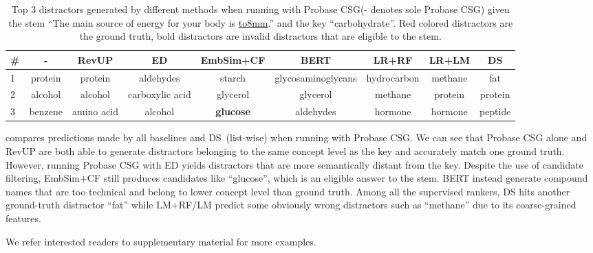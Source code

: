 \begin{table}[htb!]%
	\small
	\centering
		\begin{tabular}{lcccccccc} %
			\toprule
			\# &-  &RevUP &ED  & EmbSim+CF &BERT & LR+RF & LR+LM & \textbf{DS}\\
			\midrule
			1 &\color{red}protein   &\color{red}protein  &aldehydes  &starch &glycosaminoglycans  & hydrocarbon &methane    &\color{red} fat\\
			\midrule
			2 &alcohol  &alcohol  &carboxylic acid  &glycerol  &glycerol &methane  &\color{red}protein    &\color{red}protein \\
			\midrule
			3 &benzene  &amino acid  &alcohol   &\textbf{glucose}  &aldehydes &hormone  &hormone   &peptide \\
			\bottomrule
		\end{tabular}
		\caption{Top 3 distractors generated by different methods when running with Probase CSG(- denotes sole Probase CSG)
	given the stem ``The main source of energy for your body is \underline{\hbox to8mm{}}.'' and the key ``{\color{blue}carbohydrate}''. Red colored distractors are the ground truth, bold distractors are invalid distractors that are eligible to the stem.}
		\label{table:example}
	\end{table}
 compares predictions made by all baselines and DS~(list-wise) when running with Probase CSG. We can see that Probase CSG alone and RevUP are both able to generate distractors belonging to the same concept level as the key and accurately match one ground truth. However, running Probase CSG with ED yields 
distractors that are more semantically distant from the key. 
Despite the use of candidate filtering, EmbSim+CF still produces candidates 
like ``glucose'', which is an eligible answer to the stem. 
BERT instead generate compound names that are too technical and belong to lower concept level than ground truth. 
Among all the supervised rankers, DS hits another ground-truth distractor 
``fat'' while LM+RF/LM predict some obviously wrong distractors 
such as ``methane'' due to its coarse-grained features.

We refer interested readers to supplementary material for more examples.


